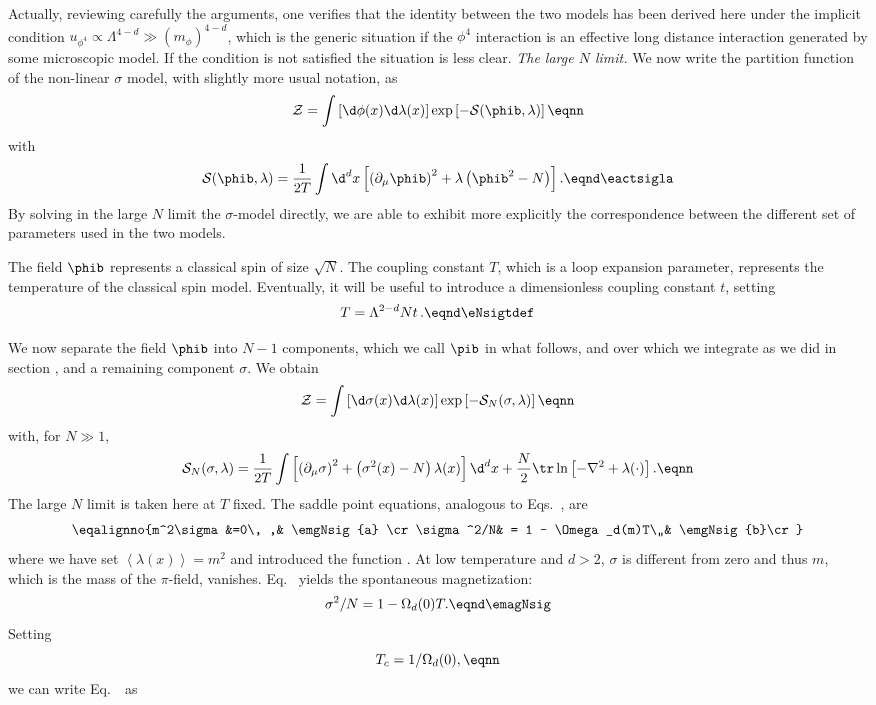 Actually, reviewing carefully the arguments, one verifies that the identity between the two models has been derived here under the implicit
condition $u_{\phi^4}\propto \Lambda ^{4-d}\gg(m_{\phi})^{4-d}$, which is the generic situation if
the $\phi^4$ interaction is an effective long distance interaction generated
 by some microscopic model. If the condition is not satisfied the situation
is less clear.
\medskip
{\it The large $N$ limit.} We now  write the partition function of the non-linear $\sigma $ model, with slightly more usual notation, as
$${\cal Z}= \int \left[\d\phi(x)\d\lambda(x)\right]
\exp\left[-{\cal S}(\phib,\lambda)\right]  \eqnn  $$
with
$${\cal S}(\phib,\lambda) = {1 \over 2T}\int \d^{d}x \left[ \left(
\partial_{\mu}\phib \right)^2 + \lambda \left(\phib^2 -N \right)\right].
\eqnd\eactsigla $$
By solving  in the large $N$ limit the $\sigma$-model directly, we are able to exhibit more explicitly the correspondence
between the different set of parameters used in the two models.
\par
The field $\phib$ represents a classical spin of size $\sqrt{N}$. The
coupling constant $T$, which is a loop expansion parameter, represents
the temperature of the classical spin model. Eventually, it will be
useful to introduce a dimensionless coupling constant $t$, setting
$$T=\Lambda^{2-d} Nt\,. \eqnd\eNsigtdef $$
\par
We now separate the field $\phib$ into $N-1$ components,
which we call $\pib$ in what follows, and over which we
integrate as we did in section \ssNbosgen,  and a remaining component $\sigma$. We obtain
$${\cal Z}= \int \left[\d\sigma(x)\d\lambda(x)\right]
\exp\left[-{\cal S}_N(\sigma,\lambda)\right]  \eqnn $$
with, for $N\gg 1$,
$${\cal S}_N  (\sigma,\lambda  )=
 {1 \over 2T}\int \left[ \left(\partial_{\mu}\sigma \right)^2+
\left(\sigma^2 (x)-N\right) \lambda (x)
\right] \d^{d}x +{N \over 2}   \tr\ln \left[
-\nabla^2 +\lambda (\cdot) \right] .  \eqnn $$
The large $N$ limit is  taken here at $T $ fixed. The saddle point equations,
analogous to Eqs.~\esaddleN{}, are
\eqna\emgNsig
$$\eqalignno{m^2\sigma &=0\, ,& \emgNsig{a} \cr
\sigma^2/N& = 1 -   \Omega _d(m)T\,,& \emgNsig{b}\cr} $$
where we have set $\left<\lambda(x)\right>=m^2$ and introduced the function \etadepole. At low temperature and $d>2$, $\sigma $
is different from zero and thus $m$, which is the mass of the $\pi$-field,
vanishes. Eq.~ yields the spontaneous magnetization:
$$\sigma^ 2 /N = 1 -  \Omega _d(0)T   .\eqnd\emagNsig $$
Setting
$$  T_c = 1/ \Omega _d(0) ,\eqnn $$
we can write Eq.~\emagNsig\ as
